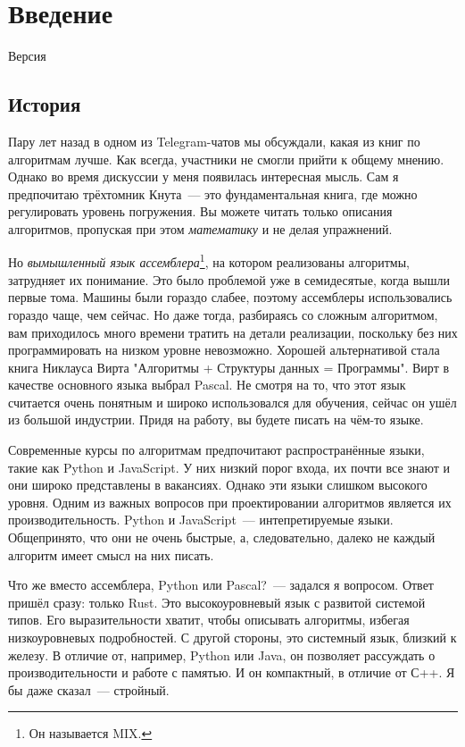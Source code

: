 \chapter{Введение}

Версия 

\section{История}

Пару лет назад в одном из Telegram-чатов мы обсуждали, какая из книг по алгоритмам лучше.
Как всегда, участники не смогли прийти к общему мнению.
Однако во время дискуссии у меня появилась интересная мысль.
Сам я предпочитаю трёхтомник Кнута~--- это фундаментальная книга, где можно регулировать уровень погружения.
Вы можете читать только описания алгоритмов, пропуская при этом {\em математику} и не делая упражнений.

Но {\em вымышленный язык ассемблера}\footnote{Он называется MIX.}, на котором реализованы алгоритмы, затрудняет их понимание.
Это было проблемой уже в семидесятые, когда вышли первые тома.
Машины были гораздо слабее, поэтому ассемблеры использовались гораздо чаще, чем сейчас.
Но даже тогда, разбираясь со сложным алгоритмом, вам приходилось много времени тратить на детали реализации, поскольку без них программировать на низком уровне невозможно.
Хорошей альтернативой стала книга Никлауса Вирта "Алгоритмы + Структуры данных = Программы".
Вирт в качестве основного языка выбрал Pascal.
Не смотря на то, что этот язык считается очень понятным и широко использовался для обучения, сейчас он ушёл из большой индустрии.
Придя на работу, вы будете писать на чём-то языке.

Современные курсы по алгоритмам предпочитают распространённые языки, такие как Python и JavaScript.
У них низкий порог входа, их почти все знают и они широко представлены в вакансиях.
Однако эти языки слишком высокого уровня.
Одним из важных вопросов при проектировании алгоритмов является их производительность.
Python и JavaScript~--- интепретируемые языки. Общепринято, что они не очень быстрые, а, следовательно, далеко не каждый алгоритм имеет смысл на них писать.

Что же вместо ассемблера, Python или Pascal?~--- задался я вопросом.
Ответ пришёл сразу: только Rust.
Это высокоуровневый язык с развитой системой типов.
Его выразительности хватит, чтобы описывать алгоритмы, избегая низкоуровневых подробностей.
С другой стороны, это системный язык, близкий к железу.
В отличие от, например, Python или Java, он позволяет рассуждать о производительности и работе с памятью.
И он компактный, в отличие от С++.
Я бы даже сказал~--- стройный.

